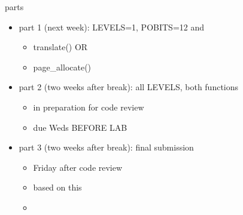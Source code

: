 \begin{frame}{parts}
    \begin{itemize}
    \item part 1 (next week): LEVELS=1, POBITS=12 and
        \begin{itemize}
        \item translate() OR
        \item page\_allocate()
        \end{itemize}
    \item part 2 (two weeks after break): all LEVELS, both functions
        \begin{itemize}
        \item in preparation for code review
        \item due Weds BEFORE LAB
        \end{itemize}
    \item part 3 (two weeks after break): final submission
        \begin{itemize}
        \item Friday after code review
        \item {} based on this
        \item {}
        \end{itemize}
    \end{itemize}
\end{frame}
